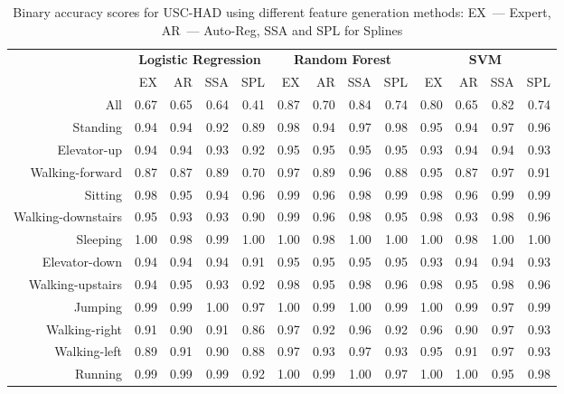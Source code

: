 \documentclass{llncs}
\begin{document}
\begin{table}[!h]
	\centering
	\footnotesize
	\caption{Binary accuracy scores for USC-HAD using different feature generation methods: EX~--- Expert, AR~--- Auto-Reg, SSA and  SPL for Splines}
	\label{my-label}
	\begin{tabular}{r|rrrr|rrrr|rrrr|}
		& \multicolumn{4}{c|}{\textbf{Logistic Regression}} & \multicolumn{4}{c|}{\textbf{Random Forest}} & \multicolumn{4}{c|}{\textbf{SVM}}          \\ \cline{2-13} 
		& EX   & AR   & SSA   & SPL  & EX  & AR & SSA & SPL & EX & AR & SSA & SPL \\ \hline
		All& 0.67 & 0.65 & 0.64 & 0.41 & 0.87 & 0.70 & 0.84 & 0.74 & 0.80 & 0.65 & 0.82 & 0.74 \\
		Standing& 0.94 & 0.94 & 0.92 & 0.89 & 0.98 & 0.94 & 0.97 & 0.98 & 0.95 & 0.94 & 0.97 & 0.96 \\
		Elevator-up& 0.94 & 0.94 & 0.93 & 0.92 & 0.95 & 0.95 & 0.95 & 0.95 & 0.93 & 0.94 & 0.94 & 0.93 \\
		Walking-forward& 0.87 & 0.87 & 0.89 & 0.70 & 0.97 & 0.89 & 0.96 & 0.88 & 0.95 & 0.87 & 0.97 & 0.91 \\
		Sitting& 0.98 & 0.95 & 0.94 & 0.96 & 0.99 & 0.96 & 0.98 & 0.99 & 0.98 & 0.96 & 0.99 & 0.99 \\
		Walking-downstairs& 0.95 & 0.93 & 0.93 & 0.90 & 0.99 & 0.96 & 0.98 & 0.95 & 0.98 & 0.93 & 0.98 & 0.96 \\
		Sleeping& 1.00 & 0.98 & 0.99 & 1.00 & 1.00 & 0.98 & 1.00 & 1.00 & 1.00 & 0.98 & 1.00 & 1.00 \\
		Elevator-down& 0.94 & 0.94 & 0.94 & 0.91 & 0.95 & 0.95 & 0.95 & 0.95 & 0.93 & 0.94 & 0.94 & 0.93 \\
		Walking-upstairs& 0.94 & 0.95 & 0.93 & 0.92 & 0.98 & 0.95 & 0.98 & 0.96 & 0.98 & 0.95 & 0.98 & 0.96 \\
		Jumping& 0.99 & 0.99 & 1.00 & 0.97 & 1.00 & 0.99 & 1.00 & 0.99 & 1.00 & 0.99 & 0.97 & 0.99 \\
		Walking-right& 0.91 & 0.90 & 0.91 & 0.86 & 0.97 & 0.92 & 0.96 & 0.92 & 0.96 & 0.90 & 0.97 & 0.93 \\
		Walking-left& 0.89 & 0.91 & 0.90 & 0.88 & 0.97 & 0.93 & 0.97 & 0.93 & 0.95 & 0.91 & 0.97 & 0.93 \\
		Running& 0.99 & 0.99 & 0.99 & 0.92 & 1.00 & 0.99 & 1.00 & 0.97 & 1.00 & 1.00 & 0.95 & 0.98\\ \hline
	\end{tabular}
	\label{tbl::uschad_methods_results}
\end{table}
\end{document}
